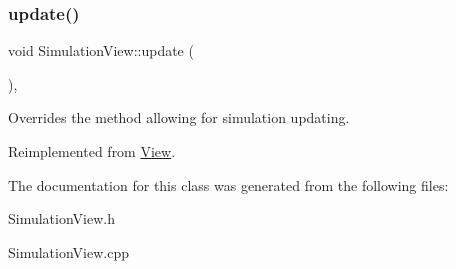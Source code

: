 \subsubsection{\texorpdfstring{update()}{update()}}
{\footnotesize\ttfamily void Simulation\+View\+::update (\begin{DoxyParamCaption}{ }\end{DoxyParamCaption})\hspace{0.3cm}{\ttfamily [override]}, {\ttfamily [virtual]}}



Overrides the method allowing for simulation updating. 



Reimplemented from \mbox{\hyperlink{class_view_aee97523bb9aaf26c1d09528e4f6911b7}{View}}.



The documentation for this class was generated from the following files\+:\begin{DoxyCompactItemize}
\item 
Simulation\+View.\+h\item 
Simulation\+View.\+cpp\end{DoxyCompactItemize}
